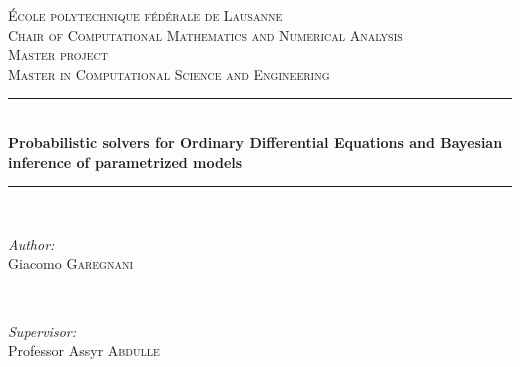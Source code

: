 \begin{titlepage}
\newcommand{\HRule}{\rule{\linewidth}{0.5mm}} %

\center %
 

\vspace{3cm}
\textsc{\LARGE École polytechnique fédérale de Lausanne}\\[0.5cm] %
\textsc{\large Chair of Computational Mathematics and Numerical Analysis}\\[1.5cm] %
\textsc{\LARGE Master project}\\[0.5cm] %
\textsc{\large Master in Computational Science and Engineering}\\[0.5cm] %


\HRule \\[0.4cm]
{ \huge \bfseries Probabilistic solvers for Ordinary Differential Equations and Bayesian inference of parametrized models}\\[0.4cm] %
\HRule \\[1.5cm]
 

\begin{minipage}{0.4\textwidth}
\begin{flushleft} \large
\emph{Author:}\\
Giacomo \textsc{Garegnani}
\end{flushleft}
\end{minipage}
~
\begin{minipage}{0.4\textwidth}
\begin{flushright} \large
\emph{Supervisor:} \\
Professor Assyr \textsc{Abdulle}%
\end{flushright}
\end{minipage}\\[6cm]


\end{titlepage}
